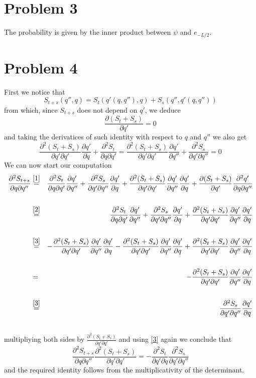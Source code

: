 \documentclass[]{article}
\newcommand{\D}[2]{\frac{\partial #1}{\partial #2}}
\newcommand{\DD}[3]{\frac{\partial^2 #1}{\partial #2 \partial #3}}
\begin{document}
\section{Problem 3}

The probability is given by the inner product between $\psi$ and $e_{-L/2}$.



\section{Problem 4}
First we notice that 
\begin{equation}\label{1}
	S_{t+s}(q'',q) = S_{t}(q'(q,q''),q) + S_{s}(q'', q'(q,q''))
\end{equation}
from which, since $S_{t+s}$ does not depend on $q'$, we deduce
\begin{equation}\label{2}
	\D{(S_{t}+S_{s})}{q'} = 0
\end{equation}
and taking the derivatices of such identity with respect to $q$ and $q''$ we also get
\begin{equation}\label{3}
	\DD{(S_{t}+S_{s})}{q'}{q'}\D{q'}{q} + \DD{S_t}{q}{q'} = \DD{(S_{t}+S_{s})}{q'}{q'}\D{q'}{q''} + \DD{S_s}{q'}{q''} = 0
\end{equation}
We can now start our computation
\begin{eqnarray*}
	\DD{S_{t+s}}{q}{q''} 
	&\overset{\eqref{1}}=& \DD{S_{t}}{q}{q'}\D{q'}{q''} + \DD{S_{s}}{q'}{q''}\D{q'}{q} + \DD{(S_t+S_s)}{q'}{q'}\D{q'}{q''}\D{q'}{q} + \D{(S_t+S_s)}{q'}\DD{q'}{q}{q''} \\\\
	&\overset{\eqref{2}}=& \DD{S_{t}}{q}{q'}\D{q'}{q''} + \DD{S_{s}}{q'}{q''}\D{q'}{q} + \DD{(S_t+S_s)}{q'}{q'}\D{q'}{q''}\D{q'}{q} \\\\
	&\overset{\eqref{3}}=& -\DD{(S_t+S_s)}{q'}{q'}\D{q'}{q''}\D{q'}{q} -\DD{(S_t+S_s)}{q'}{q'}\D{q'}{q''}\D{q'}{q} + \DD{(S_t+S_s)}{q'}{q'}\D{q'}{q''}\D{q'}{q} \\\\
	&=& -\DD{(S_t+S_s)}{q'}{q'}\D{q'}{q''}\D{q'}{q} \\\\
	&\overset{\eqref{3}}=& \DD{S_s}{q'}{q''}\D{q'}{q} \\\\
\end{eqnarray*}
multipliying both sides by $\DD{(S_{t}+S_{s})}{q'}{q'}$ and using \eqref{3} again we conclude that
$$ \DD{S_{t+s}}{q}{q''}\DD{(S_{t}+S_{s})}{q'}{q'} = -\DD{S_t}{q'}{q}\DD{S_s}{q'}{q''} $$
and the required identity follows from the multiplicativity of the determinant.
\end{document}
